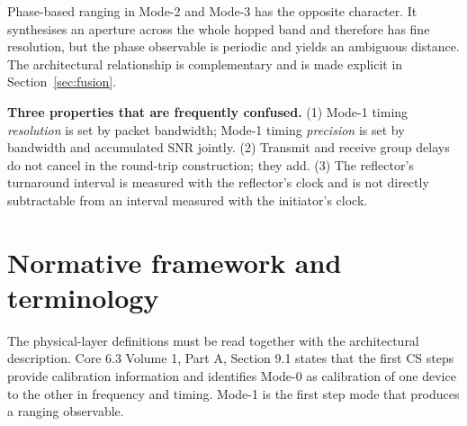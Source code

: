 \documentclass[11pt,a4paper]{article}
\begin{document}
Phase-based ranging in Mode-2 and Mode-3 has the opposite character. It synthesises an aperture
across the whole hopped band and therefore has fine resolution, but the phase observable is
periodic and yields an ambiguous distance. The architectural relationship is complementary and is
made explicit in Section~\ref{sec:fusion}.

\begin{callout}
\textbf{Three properties that are frequently confused.} (1) Mode-1 timing \emph{resolution} is set
by packet bandwidth; Mode-1 timing \emph{precision} is set by bandwidth and accumulated SNR
jointly. (2) Transmit and receive group delays do not cancel in the round-trip construction; they
add. (3) The reflector's turnaround interval is measured with the reflector's clock and is not
directly subtractable from an interval measured with the initiator's clock.
\end{callout}

\section{Normative framework and terminology}

The physical-layer definitions must be read together with the architectural description. Core 6.3
Volume 1, Part A, Section 9.1 states that the first CS steps provide calibration information and
identifies Mode-0 as calibration of one device to the other in frequency and timing. Mode-1 is the
first step mode that produces a ranging observable.
\end{document}
